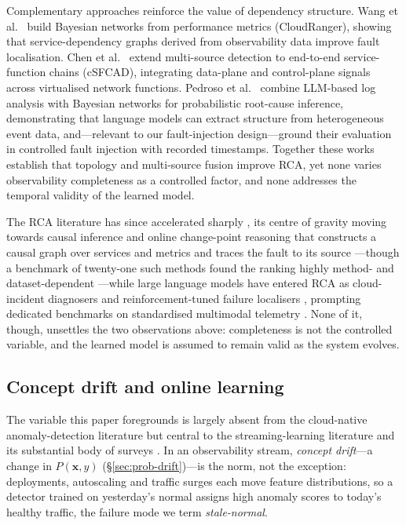 \documentclass[pdflatex,sn-mathphys-num]{sn-jnl}%
\theoremstyle{thmstyleone}%
\theoremstyle{thmstyletwo}%
\theoremstyle{thmstylethree}%
\begin{document}
Complementary approaches reinforce the value of dependency structure. Wang et al.\ \cite{wang2018} build Bayesian networks from performance metrics (CloudRanger), showing that service-dependency graphs derived from observability data improve fault localisation. Chen et al.\ \cite{chen2025} extend multi-source detection to end-to-end service-function chains (cSFCAD), integrating data-plane and control-plane signals across virtualised network functions. Pedroso et al.\ \cite{pedroso2025} combine LLM-based log analysis with Bayesian networks for probabilistic root-cause inference, demonstrating that language models can extract structure from heterogeneous event data, and---relevant to our fault-injection design---ground their evaluation in controlled fault injection with recorded timestamps. Together these works establish that topology and multi-source fusion improve RCA, yet none varies observability completeness as a controlled factor, and none addresses the temporal validity of the learned model.

The RCA literature has since accelerated sharply \cite{wang2024rcasurvey}, its centre of gravity moving towards causal inference and online change-point reasoning that constructs a causal graph over services and metrics and traces the fault to its source \cite{pham2024rca,yao2024chainofevent,pham2024baro}---though a benchmark of twenty-one such methods found the ranking highly method- and dataset-dependent \cite{pham2024rca}---while large language models have entered RCA as cloud-incident diagnosers \cite{chen2024rca} and reinforcement-tuned failure localisers \cite{zhang2025thinkfl}, prompting dedicated benchmarks on standardised multimodal telemetry \cite{pham2025rcaeval}. None of it, though, unsettles the two observations above: completeness is not the controlled variable, and the learned model is assumed to remain valid as the system evolves.

\subsection{Concept drift and online learning}\label{sec:bg-drift}

The variable this paper foregrounds is largely absent from the cloud-native anomaly-detection literature but central to the streaming-learning literature and its substantial body of surveys \cite{arora2024drift,hovakimyan2024drift,lukats2025drift}. In an observability stream, \emph{concept drift}---a change in $P(\mathbf{x}, y)$ (\S\ref{sec:prob-drift})---is the norm, not the exception: deployments, autoscaling and traffic surges each move feature distributions, so a detector trained on yesterday's normal assigns high anomaly scores to today's healthy traffic, the failure mode we term \emph{stale-normal}.
\end{document}
